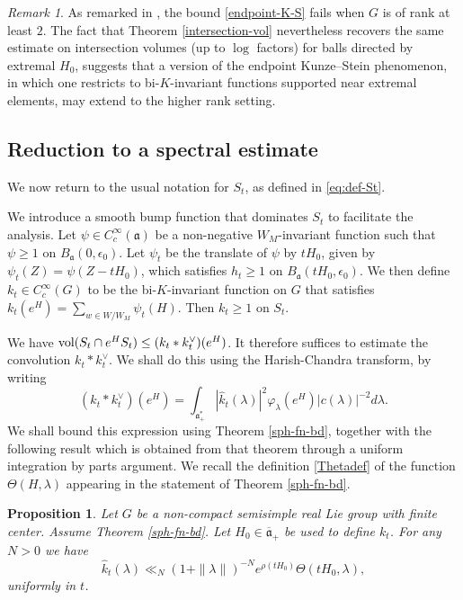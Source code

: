 \documentclass[12pt]{amsart}
\newtheorem{prop}[theorem]{Proposition}
\theoremstyle{remark}
\newtheorem{remark}[theorem]{Remark}
\newcommand{\ga}{\mathfrak a}
\begin{document}
\begin{remark}
As remarked in \cite{Ionescu_00}, the bound \eqref{endpoint-K-S} fails when $G$ is of rank at least $2$. The fact that Theorem \ref{intersection-vol} nevertheless recovers the same estimate on intersection volumes (up to $\log$ factors) for balls directed by extremal $H_0$, suggests that a version of the endpoint Kunze--Stein phenomenon, in which one restricts to bi-$K$-invariant functions supported near extremal elements, may extend to the higher rank setting. 
\end{remark}

\subsection{Reduction to a spectral estimate}\label{sec:red-to-spec}


We now return to the usual notation for $S_t$, as defined in \eqref{eq:def-St}. 

We introduce a smooth bump function that dominates $S_t$ to facilitate the analysis. Let $\psi \in C_c^\infty(\mathfrak{a})$ be a non-negative $W_M$-invariant function such that $\psi \geq 1$ on $B_{\mathfrak{a}}(0, \epsilon_0)$. Let $\psi_t$ be the translate of $\psi$ by $t H_0$, given by $\psi_t(Z) = \psi(Z - t H_0)$, which satisfies $h_t \geq 1$ on $B_{\mathfrak{a}}(t H_0, \epsilon_0)$. We then define $k_t \in C_c^\infty(G)$ to be the bi-$K$-invariant function on $G$ that satisfies $k_t(e^H) = \sum_{w \in W/W_M} \psi_t(H)$. Then $k_t \geq 1$ on $S_t$.

We have $\textnormal{vol}( S_t \cap e^H S_t ) \le (k_t * k_t^\vee)(e^H)$. It therefore suffices to estimate the convolution $k_t * k_t^\vee$.  We shall do this using the Harish-Chandra transform, by writing
\begin{equation}
\label{kHC}
(k_t * k_t^\vee)(e^H) = \int_{ \ga^*_+} | \widehat{k}_t(\lambda) |^2 \varphi_\lambda(e^H) | c(\lambda)|^{-2} d\lambda.
\end{equation}
We shall bound this expression using Theorem \ref{sph-fn-bd}, together with the following result which is obtained from that theorem through a uniform integration by parts argument. We recall the definition \eqref{Thetadef} of the function $\Theta(H,\lambda)$ appearing in the statement of Theorem \ref{sph-fn-bd}.
\begin{prop}
\label{khatdecay}
Let $G$ be a non-compact semisimple real Lie group with finite center. Assume Theorem \ref{sph-fn-bd}. Let $H_0\in\overline{\ga}_+$ be used to define $k_t$. For any $N > 0$ we have
\[
\widehat{k}_t(\lambda) \ll_N (1 + \| \lambda \|)^{-N} e^{ \rho(tH_0)} \Theta(tH_0,\lambda),
\]
uniformly in $t$.
\end{prop}
\end{document}
